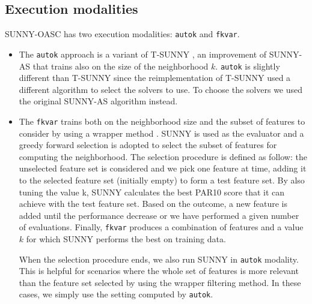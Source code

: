 \documentclass[tablecaption=bottom,wcp]{jmlr} %
\begin{document}


\subsection{Execution modalities}

SUNNY-OASC has two execution modalities: \texttt{autok} and 
\texttt{fkvar}.

\begin{itemize}
\item The \texttt{autok} approach is a variant of T-SUNNY \citep{DBLP:conf/lion/LindauerBH16}, 
an improvement of SUNNY-AS that trains also on the size of the neighborhood 
$k$. \texttt{autok} is slightly different than T-SUNNY since the 
reimplementation of T-SUNNY used a different algorithm to select the 
solvers to use. To choose the solvers we used the original SUNNY-AS 
algorithm instead.


  \item The \texttt{fkvar} trains both on the neighborhood size and 
the subset of features to consider by using a wrapper method 
\citep{Kohavi97wrappersfor}. SUNNY is used as the evaluator and a 
greedy forward selection is adopted to select the subset of features for 
computing the neighborhood.
% 
The selection procedure is defined as follow: 
the unselected feature set is considered and we pick one feature at time, 
adding it to the selected feature set (initially empty) to form a test 
feature set. By also tuning the value k, SUNNY calculates the best PAR10 score 
that it can achieve with the test feature set. Based on the outcome, a new 
feature is added until the performance decrease or we have performed a given 
number of evaluations. Finally, \texttt{fkvar} 
produces a combination of features and a value $k$ for which SUNNY performs the 
best on training data.

When the selection procedure ends, we also run SUNNY in %
\texttt{autok} modality. This is helpful
for scenarios where the whole set of features is more relevant than the 
feature set selected by using the wrapper filtering method. 
In these cases, we simply use the setting computed by \texttt{autok}.
\end{itemize}
 
\end{document}
